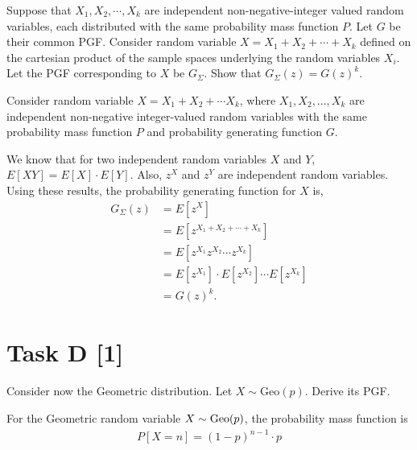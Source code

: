 \begin{tcolorbox}
    Suppose that $X_1, X_2, \cdots, X_k$ are independent non-negative-integer
    valued random variables, each distributed with the same probability mass
    function $P$.
    Let $G$ be their common PGF. Consider random variable $X = X_1 + X_2 + \cdots
    + X_k$ defined on the cartesian product of the sample spaces underlying the
    random variables $X_i$. Let the PGF corresponding to $X$ be $G_\Sigma$. Show
    that $G_\Sigma(z) = G(z)^k$.
\end{tcolorbox}


Consider random variable $X=X_1+X_2+\cdots X_k$, where $X_1, X_2, \ldots, X_k$
are independent non-negative integer-valued random variables with the same
probability mass function $P$ and probability generating function $G$.

We know that for two independent random variables $X$ and $Y$, $E[XY]=E[X]\cdot
E[Y]$. Also, $z^X$ and $z^Y$ are independent random variables. Using these
results, the probability generating function for $X$ is,
\begin{equation}
    \begin{aligned}
        G_\Sigma(z) &= E[z^X] \\
        &= E[z^{X_1+X_2+\cdots+X_k}] \\
        &= E[z^{X_1}z^{X_2}\cdots z^{X_k}] \\
        &= E[z^{X_1}]\cdot E[z^{X_2}]\cdots E[z^{X_k}] \\
        &= G(z)^k.
    \end{aligned}
    \label{e1.6}
\end{equation}


\section*{\colS{$\S$} Task D \hfill \normalfont \large [1]}

\begin{tcolorbox}
    Consider now the Geometric distribution. Let $X \sim \text{Geo}(p)$. Derive
    its PGF.
\end{tcolorbox}


For the Geometric random variable $X \sim \text{Geo}(p)$, the probability mass function
is
\begin{equation}
    \begin{aligned}
        P[X=n]=(1-p)^{n-1}\cdot p
    \end{aligned}
     \label{e1.7}
\end{equation}

